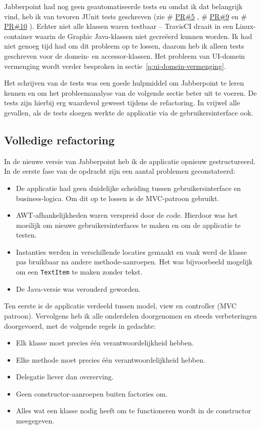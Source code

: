\documentclass[a4paper]{article}
\makeatletter
\newcommand*{\repo}{\begingroup\@makeother\#\@repo}
\newcommand*{\@repo}[2]{%
  \href{https://github.com/DanielSchiavini/design-patterns-assignment/#1}{#2}%
  \endgroup}
\newcommand{\PR}[1]{\repo{pull/#1}{PR\##1}}
\newcommand{\code}[1]{\lstinline[columns=fixed]{#1}}
\makeatother
\begin{document}
    Jabberpoint had nog geen geautomatiseerde tests en omdat ik dat belangrijk vind, heb ik van tevoren JUnit tests geschreven (zie \PR{5}, \PR{9} en \PR{10}).
    Echter niet alle klassen waren testbaar -- TravisCI draait in een Linux-container waarin de Graphic Java-klassen niet gecreëerd kunnen worden.
    Ik had niet genoeg tijd had om dit probleem op te lossen, daarom heb ik alleen tests geschreven voor de domein- en accessor-klassen.
    Het probleem van UI-domein vermenging wordt verder besproken in sectie~\ref{q:ui-domein-vermenging}.

    Het schrijven van de tests was een goede hulpmiddel om Jabberpoint te leren kennen en om het probleemanalyse van de volgende sectie beter uit te voeren.
	De tests zijn hierbij erg waardevol geweest tijdens de refactoring.
	In vrijwel alle gevallen, als de tests sloegen werkte de applicatie via de gebruikersinterface ook.

	\subsection*{Volledige refactoring}
	In de nieuwe versie van Jabberpoint heb ik de applicatie opnieuw gestructureerd.
	In de eerste fase van de opdracht zijn een aantal problemen geconstateerd:
	\begin{itemize}
		\item De applicatie had geen duidelijke scheiding tussen gebruikersinterface en business-logica.
			Om dit op te lossen is de MVC-patroon gebruikt.
		\item AWT-afhankelijkheden waren verspreid door de code.
			Hierdoor was het moeilijk om nieuwe gebruikersinterfaces te maken en om de applicatie te testen.
		\item Instanties werden in verschillende locaties gemaakt en vaak werd de klasse pas bruikbaar na andere methode-aanroepen.
			Het was bijvoorbeeld mogelijk om een \code{TextItem} te maken zonder tekst.
		\item De Java-versie was verouderd geworden.
	\end{itemize}

	Ten eerste is de applicatie verdeeld tussen model, view en controller (MVC patroon).
	Vervolgens heb ik alle onderdelen doorgenomen en steeds verbeteringen doorgevoerd, met de volgende regels in gedachte:
	\begin{itemize}
		\item Elk klasse moet precies één verantwoordelijkheid hebben.
		\item Elke methode moet precies één verantwoordelijkheid hebben.
		\item Delegatie liever dan overerving.
		\item Geen constructor-aanroepen buiten factories om.
		\item Alles wat een klasse nodig heeft om te functioneren wordt in de constructor meegegeven.
	\end{itemize}
\end{document}
